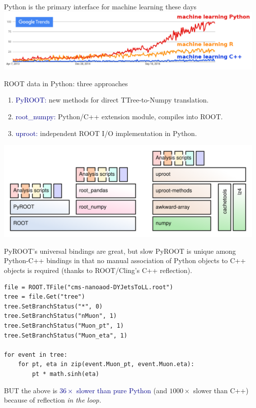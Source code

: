 \documentclass[aspectratio=169]{beamer}
\begin{document}
\begin{frame}{Python is the primary interface for machine learning these days}
\vspace{1 cm}
\includegraphics[width=\linewidth]{python-r-cpp-googletrends-machinelearning.png}
\end{frame}

\begin{frame}{ROOT data in Python: three approaches}
\vspace{0.3 cm}
\large
\begin{enumerate}
\item \textcolor{darkblue}{PyROOT:} new methods for direct TTree-to-Numpy translation.
\item \textcolor{darkblue}{root\_numpy:} Python/C++ extension module, compiles into ROOT.
\item \textcolor{darkblue}{uproot:} independent ROOT I/O implementation in Python.
\end{enumerate}

\vspace{0.2 cm}
\includegraphics[width=\linewidth]{abstraction-layers.png}
\end{frame}

\begin{frame}[fragile]{PyROOT's universal bindings are great, but slow}
\vspace{0.5 cm}
PyROOT is unique among Python-C++ bindings in that no manual association of Python objects to C++ objects is required (thanks to ROOT/Cling's C++ reflection).

\vspace{0.25 cm}
\small
\begin{verbatim}
file = ROOT.TFile("cms-nanoaod-DYJetsToLL.root")
tree = file.Get("tree")
tree.SetBranchStatus("*", 0)
tree.SetBranchStatus("nMuon", 1)
tree.SetBranchStatus("Muon_pt", 1)
tree.SetBranchStatus("Muon_eta", 1)

for event in tree:
    for pt, eta in zip(event.Muon_pt, event.Muon.eta):
        pt * math.sinh(eta)
\end{verbatim}
\large

\vspace{0.25 cm}
BUT the above is \textcolor{darkblue}{$36\times$ slower than pure Python} (and $1000\times$ slower than C++) because of reflection {\it in the loop.}
\end{frame}
\end{document}

